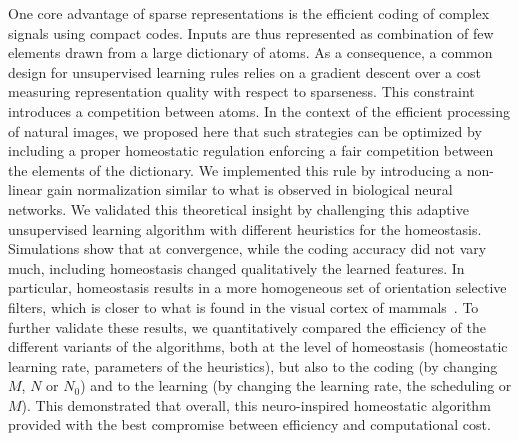 \documentclass[letterpaper,final,conference,10pt]{IEEEtran}
\newcommand{\citep}[1]{\cite{#1}}
\begin{document}
One core advantage of sparse representations is the efficient coding of complex signals using compact codes. Inputs are thus represented as combination of few elements drawn from a large dictionary of atoms. As a consequence, a common design for unsupervised learning rules relies on a gradient descent over a cost measuring representation quality with respect to sparseness. This constraint introduces a competition between atoms. In the context of the efficient processing of natural images, we proposed here that such strategies can be optimized by including a proper homeostatic regulation enforcing a fair competition between the elements of the dictionary. We implemented this rule by introducing a non-linear gain normalization similar to what is observed in biological neural networks. We validated this theoretical insight by challenging this adaptive unsupervised learning algorithm with different heuristics for the homeostasis. Simulations show that at convergence, while the coding accuracy did not vary much, including homeostasis changed qualitatively the learned features. In particular, homeostasis results in a more homogeneous set of orientation selective filters, which is closer to what is found in the visual cortex of mammals~\citep{Ringach02,Rehn07,Loxley17}. To further validate these results, we quantitatively compared the efficiency of the different variants of the algorithms, both at the level of homeostasis (homeostatic learning rate, parameters of the heuristics), but also to the coding (by changing $M$, $N$ or $N_0$) and to the learning (by changing the learning rate, the scheduling or $M$). This demonstrated that overall, this neuro-inspired homeostatic algorithm provided with the best compromise between efficiency and computational cost. 
\end{document}
